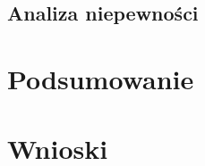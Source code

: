 \documentclass[a4paper,12pts]{article}
\begin{document}
	
	\subsection{Analiza niepewności}
	

	\section{Podsumowanie}

	
	\section{Wnioski}
\end{document}
